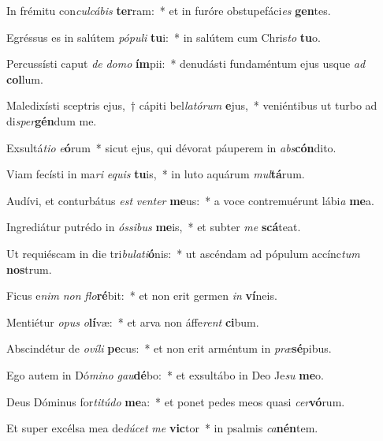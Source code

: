 \item In frémitu con\textit{cul}\textit{cá}\textit{bis} \textbf{ter}ram:~* et in furóre obstupefáci\textit{es} \textbf{gen}tes.
\item Egréssus es in salútem \textit{pó}\textit{pu}\textit{li} \textbf{tu}i:~* in salútem cum Chris\textit{to} \textbf{tu}o.
\item Percussísti caput \textit{de} \textit{do}\textit{mo} \textbf{ím}pii:~* denudásti fundaméntum ejus usque \textit{ad} \textbf{col}lum.
\item Maledixísti sceptris ejus,~† cápiti bel\textit{la}\textit{tó}\textit{rum} \textbf{e}jus,~* veniéntibus ut turbo ad di\textit{sper}\textbf{gén}dum me.
\item Exsultá\textit{ti}\textit{o} \textit{e}\textbf{ó}rum~* sicut ejus, qui dévorat páuperem in \textit{abs}\textbf{cón}dito.
\item Viam fecísti in ma\textit{ri} \textit{e}\textit{quis} \textbf{tu}is,~* in luto aquárum \textit{mul}\textbf{tá}rum.
\item Audívi, et conturbátus \textit{est} \textit{ven}\textit{ter} \textbf{me}us:~* a voce contremuérunt lábi\textit{a} \textbf{me}a.
\item Ingrediátur putrédo in \textit{ós}\textit{si}\textit{bus} \textbf{me}is,~* et subter \textit{me} \textbf{scá}teat.
\item Ut requiéscam in die tri\textit{bu}\textit{la}\textit{ti}\textbf{ó}nis:~* ut ascéndam ad pópulum accínc\textit{tum} \textbf{nos}trum.
\item Ficus e\textit{nim} \textit{non} \textit{flo}\textbf{ré}bit:~* et non erit germen \textit{in} \textbf{ví}neis.
\item Mentiétur \textit{o}\textit{pus} \textit{o}\textbf{lí}væ:~* et arva non áffe\textit{rent} \textbf{ci}bum.
\item Abscindétur de \textit{o}\textit{ví}\textit{li} \textbf{pe}cus:~* et non erit arméntum in \textit{præ}\textbf{sé}pibus.
\item Ego autem in Dó\textit{mi}\textit{no} \textit{gau}\textbf{dé}bo:~* et exsultábo in Deo Je\textit{su} \textbf{me}o.
\item Deus Dóminus for\textit{ti}\textit{tú}\textit{do} \textbf{me}a:~* et ponet pedes meos quasi \textit{cer}\textbf{vó}rum.
\item Et super excélsa mea de\textit{dú}\textit{cet} \textit{me} \textbf{vic}tor~* in psalmis \textit{ca}\textbf{nén}tem.

